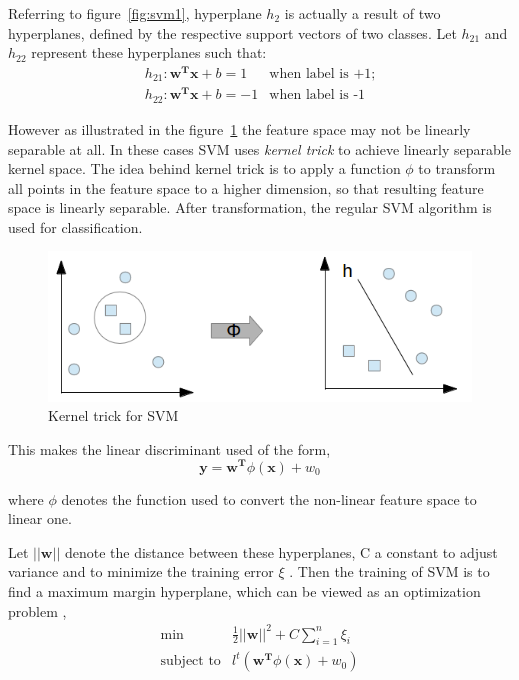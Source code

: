 Referring to figure~\ref{fig:svm1}, hyperplane $h_2$ is actually a result of two hyperplanes, defined by the respective support vectors of two classes. Let $h_{21}$ and $h_{22}$ represent these hyperplanes	such that:
\[\begin{array}{ll} 
h_{21}: \boldsymbol{w^T}\boldsymbol{x} + b = 1 & \mbox{when label is +1};\\
h_{22}: \boldsymbol{w^T}\boldsymbol{x} + b = -1 & \mbox{when label is -1}
\end{array} \]

However as illustrated in the figure~\ref{fig:svm2} the feature space may not be linearly separable at all. In these cases SVM uses \emph{kernel trick} to achieve linearly separable kernel space. The idea behind kernel trick is to apply a function $\phi$ to transform all points in the feature space to a higher dimension, so that resulting feature space is linearly separable. After transformation, the regular SVM algorithm is used for classification.

\begin{figure}[h]
  \begin{center}
    \captionsetup{justification=centering}
    \includegraphics[scale=0.50]{figures/svm2.png}
    \caption{Kernel trick for SVM}
    \label{fig:svm2}
  \end{center}
\end{figure}

This makes the linear discriminant used of the form,
\[\boldsymbol{y} = \boldsymbol{w^T}\phi(\boldsymbol{x}) + w_0 \]

where $\phi$ denotes the function used to convert the non-linear feature space to linear one.

Let $||\boldsymbol{w}||$ denote the distance between these hyperplanes, C a constant to adjust variance and to minimize the training error $\xi$ . Then the training of SVM is to find a maximum margin hyperplane, which can be viewed as an optimization problem \cite{Vapnik1995, Chang2011},
\[\begin{array}{ll} 
 \min &\frac{1}{2} ||\boldsymbol{w}||^2 + C \sum\limits_{i=1}^n \xi_i \\
 \mbox{subject to} & l^t(\boldsymbol{w^T}\phi(\boldsymbol{x}) + w_0) 
\end{array}\]

